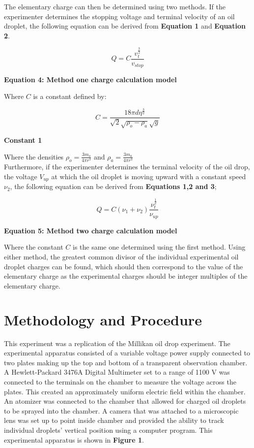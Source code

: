 \documentclass[
	letterpaper, %
	10pt, %
]{CSUniSchoolLabReport}
\begin{document}
The elementary charge can then be determined using two methods. If the experimenter determines the
stopping voltage and terminal velocity of an oil droplet, the following equation can be derived from
\textbf{Equation 1} and \textbf{Equation 2}.

$$Q = C \frac{v_t^{\frac{3}{2}}}{v_{stop}}$$
\begin{center}
    \textbf{Equation 4: Method one charge calculation model}
\end{center}

Where $C$ is a constant defined by:

$$C = \frac{18\pi d \eta^\frac{3}{2}}{\sqrt2 \sqrt{\rho_o-\rho_a}\sqrt g}$$
\begin{center}
    \textbf{Constant 1}
\end{center}

Where the densities $\rho_o = \frac{3m_o}{4\pi r^3}$ and $\rho_a = \frac{3m_a}{4\pi r^3}$\\

Furthermore, if the experimenter determines the terminal velocity of the oil drop, the voltage
$V_{up}$ at which the oil droplet is moving upward with a constant speed $\nu_2$, the following
equation can be derived from \textbf{Equations 1,2 and 3};

$$Q = C(\nu_1 + \nu_2)\frac{\nu_t^\frac{1}{2}}{\nu_{up}}$$
\begin{center}
    \textbf{Equation 5: Method two charge calculation model}
\end{center}
Where the constant $C$ is the same one determined using the first method. Using
either method, the greatest common divisor of the individual experimental oil
droplet charges can be found, which should then correspond to the value of the
elementary charge as the experimental charges should be integer multiples of
the elementary charge.
\newpage
\section{Methodology and Procedure}
This experiment was a replication of the Millikan oil drop experiment. The experimental apparatus
consisted of a variable voltage power supply connected to two plates making up the top and bottom
of a transparent observation chamber. A Hewlett-Packard 3476A Digital Multimeter set to a range of 1100 V was connected
to the terminals on the chamber to measure the
voltage across the plates. This created an approximately uniform electric field within the
chamber. An atomizer was connected to the chamber that allowed for charged oil droplets to be sprayed
into the chamber. A camera that was attached to a microscopic lens was set up to point inside chamber and
provided the ability to track individual droplets' vertical position using a computer program. This experimental
apparatus is shown in \textbf{Figure 1}.\\
\end{document}
